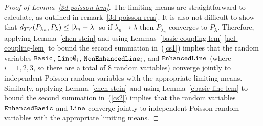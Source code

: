 \begin{proof}[Proof of Lemma~\ref{3d-poisson-lem}]
The limiting means are straightforward to calculate, as outlined in remark~\ref{3d-poisson-rem}.  It is also not difficult to show that $d_{TV}(P_{\lambda_n},P_{\lambda}) \leq \left|\lambda_n-\lambda\right|$ so if $\lambda_n \to \lambda$ then $P_{\lambda_n}$ converges to $P_\lambda$.  Therefore, applying Lemma~\ref{chen-stein} and using Lemmas~\ref{basic-coupling-lem}-\ref{nel-coupling-lem} to bound the second summation in~(\ref{cs1}) implies that the random variables $\operatorname{\tt Basic}$, $\operatorname{\tt Line\emptyset}_i$, $\operatorname{\tt NonEnhancedLine}_i$, and $\operatorname{\tt Enhanced Line}$ (where $i=1,2,3$, so there are a total of 8 random variables) converge jointly to independent Poisson random variables with the appropriate limiting means.  Similarly, applying Lemma~\ref{chen-stein} and using Lemma~\ref{ebasic-line-lem} to bound the second summation in~(\ref{cs2}) implies that the random variables $\operatorname{\tt Enhanced Basic}$ and $\operatorname{\tt Line}$ converge jointly to independent Poisson random variables with the appropriate limiting means.
\end{proof}